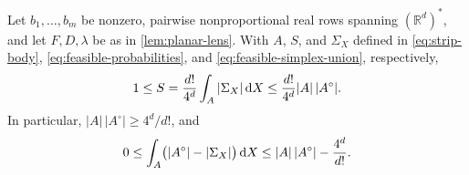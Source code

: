 \begin{proposition}\label{prop:simplex-integral}
Let $b_1,\ldots,b_m$ be nonzero, pairwise nonproportional real rows spanning $(\mathbb{R}^d)^*$, and let $F,D,\lambda$ be as in \cref{lem:planar-lens}. With $A$, $S$, and $\Sigma_X$ defined in \eqref{eq:strip-body}, \eqref{eq:feasible-probabilities}, and \eqref{eq:feasible-simplex-union}, respectively,
\begin{equation}\label{eq:simplex-integral}
 1\leq S
   =\frac{d!}{4^d}\int_A|\Sigma_X|\,\mathrm{d} X
   \leq\frac{d!}{4^d}|A|\,|A^\circ|.
\end{equation}
In particular, $|A|\,|A^\circ|\geq4^d/d!$, and
\begin{equation}\label{eq:simplex-deficit}
 0\leq\int_A\bigl(|A^\circ|-|\Sigma_X|\bigr)\,\mathrm{d} X
       \leq |A|\,|A^\circ|-\frac{4^d}{d!}.
\end{equation}
\end{proposition}

